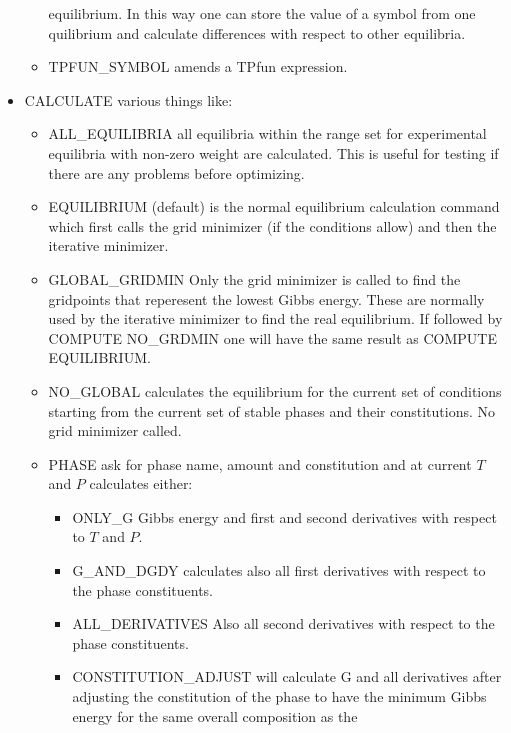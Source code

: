 \documentclass[12pt]{article}
\begin{document}
\begin{itemize}
\begin{itemize}
    equilibrium.  In this way one can store the value of a symbol from
    one quilibrium and calculate differences with respect to other
    equilibria.
  \item TPFUN\_SYMBOL amends a TPfun expression.
  \end{itemize}
\item CALCULATE various things like:
  \begin{itemize}
  \item ALL\_EQUILIBRIA all equilibria within the range set for
    experimental equilibria with non-zero weight are calculated.  This
    is useful for testing if there are any problems before optimizing.
  \item EQUILIBRIUM (default) is the normal equilibrium calculation
    command which first calls the grid minimizer (if the conditions
    allow) and then the iterative minimizer.
  \item GLOBAL\_GRIDMIN Only the grid minimizer is called to find the
    gridpoints that reperesent the lowest Gibbs energy.  These are
    normally used by the iterative minimizer to find the real
    equilibrium.  If followed by COMPUTE NO\_GRDMIN one will have the
    same result as COMPUTE EQUILIBRIUM.
  \item NO\_GLOBAL calculates the equilibrium for the current set of
    conditions starting from the current set of stable phases and
    their constitutions.  No grid minimizer called.
  \item PHASE ask for phase name, amount and constitution and at
    current $T$ and $P$ calculates either:
    \begin{itemize}
    \item ONLY\_G Gibbs energy and first and second derivatives with
      respect to $T$ and $P$.
    \item G\_AND\_DGDY calculates also all first derivatives with
      respect to the phase constituents.
    \item ALL\_DERIVATIVES Also all second derivatives with respect to
      the phase constituents.
    \item CONSTITUTION\_ADJUST will calculate G and all derivatives
      after adjusting the constitution of the phase to have the
      minimum Gibbs energy for the same overall composition as the

\end{itemize}
\end{itemize}
\end{itemize}
\end{document}
